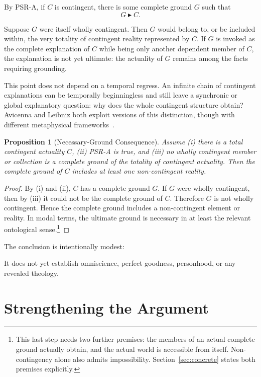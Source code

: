 \documentclass[11pt,letterpaper]{article}
\theoremstyle{plain}
\newtheorem{proposition}{Proposition}
\theoremstyle{definition}
\newcommand{\grounds}{\blacktriangleright}
\begin{document}
By PSR-A, if $C$ is contingent, there is some complete ground $G$ such that
\[
  G \grounds C.
\]

Suppose $G$ were itself wholly contingent. Then $G$ would belong to, or be included within, the very totality of contingent reality represented by $C$. If $G$ is invoked as the complete explanation of $C$ while being only another dependent member of $C$, the explanation is not yet ultimate: the actuality of $G$ remains among the facts requiring grounding.

This point does not depend on a temporal regress. An infinite chain of contingent explanations can be temporally beginningless and still leave a synchronic or global explanatory question: why does the whole contingent structure obtain? Avicenna and Leibniz both exploit versions of this distinction, though with different metaphysical frameworks~\cite{avicenna,adamson,chignell,leibniz}.

\begin{proposition}[Necessary-Ground Consequence]\label{prop:ground}
Assume (i) there is a total contingent actuality $C$, (ii) PSR-A is true, and (iii) no wholly contingent member or collection is a complete ground of the totality of contingent actuality. Then the complete ground of $C$ includes at least one non-contingent reality.
\end{proposition}

\begin{proof}
By (i) and (ii), $C$ has a complete ground $G$. If $G$ were wholly contingent, then by (iii) it could not be the complete ground of $C$. Therefore $G$ is not wholly contingent. Hence the complete ground includes a non-contingent element or reality. In modal terms, the ultimate ground is necessary in at least the relevant ontological sense.\footnote{This last step needs two further premises: the members of an actual complete ground actually obtain, and the actual world is accessible from itself. Non-contingency alone also admits impossibility. Section~\ref{sec:concrete} states both premises explicitly.}
\end{proof}

The conclusion is intentionally modest:
\begin{center}
\end{center}
It does not yet establish omniscience, perfect goodness, personhood, or any revealed theology.

\clearpage
\section{Strengthening the Argument}
\label{sec:strengthened}
\end{document}
